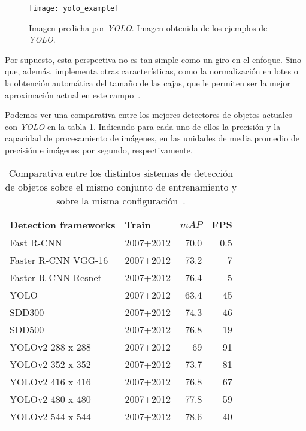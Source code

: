 \begin{figure}[h]
\centering
\texttt{[image: yolo\_example]}
\caption[Imagen predicha por \textit{YOLO}]{Imagen predicha por \textit{YOLO}. Imagen obtenida de los ejemplos de \textit{YOLO}.}
\label{fig:3.2.14}
\end{figure}

Por supuesto, esta perspectiva no es tan simple como un giro en el enfoque. Sino que, además, implementa otras características, como la normalización en lotes o la obtención automática del tamaño de las cajas, que le permiten ser la mejor aproximación actual en este campo~\cite{yolov2}.

Podemos ver una comparativa entre los mejores detectores de objetos actuales con \textit{YOLO} en la tabla \ref{tabla:comparativa_yolo}. Indicando para cada uno de ellos la precisión y la capacidad de procesamiento de imágenes, en las unidades de media promedio de precisión e imágenes por segundo, respectivamente.

\begin{table}
  \begin{center}
    \begin{tabular}{@{} l l r r@{}}
      \toprule
        \textbf{Detection frameworks}  & \textbf{Train} & \textbf{$mAP$} & \textbf{FPS} \\
      \midrule
        Fast R-CNN                     & 2007+2012      & 70.0           & 0.5 \\
        Faster R-CNN VGG-16                            & 2007+2012      & 73.2           & 7 \\
      Faster R-CNN Resnet                            & 2007+2012      & 76.4           & 5 \\
      YOLO                            & 2007+2012      & 63.4          & 45 \\
      SDD300                            & 2007+2012      & 74.3           & 46 \\
      SDD500                            & 2007+2012      & 76.8           & 19 \\\hline
      YOLOv2 288 x 288                            & 2007+2012      & 69           & 91 \\
      YOLOv2 352 x 352                            & 2007+2012      & 73.7           & 81 \\
      YOLOv2 416 x 416                            & 2007+2012      & 76.8           & 67 \\
      YOLOv2 480 x 480                            & 2007+2012      & 77.8           & 59 \\
      YOLOv2 544 x 544                            & 2007+2012      & 78.6           & 40 \\
      \bottomrule
    \end{tabular}
    \caption[Comparativa entre los distintos sistemas de detección de objetos]{Comparativa entre los distintos sistemas de detección de objetos sobre el mismo conjunto de entrenamiento y sobre la misma configuración~\cite{yolov2}.}
    \label{tabla:comparativa_yolo}
  \end{center}
\end{table}